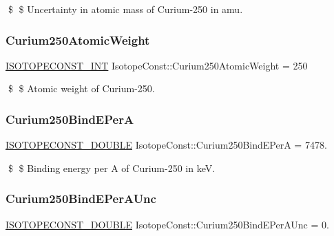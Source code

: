 \$ \$ Uncertainty in atomic mass of Curium-\/250 in amu. \mbox{\label{group___isotope_const-_curium-_cm250_gaf8953893f700808dee5cf132a2ff5e28}} 
\subsubsection{\texorpdfstring{Curium250\+Atomic\+Weight}{Curium250AtomicWeight}}
{\footnotesize\ttfamily \mbox{\hyperlink{group___isotope_const-_macros_ga5f18360b3e99483a35c32d789e62621c}{I\+S\+O\+T\+O\+P\+E\+C\+O\+N\+S\+T\+\_\+\+I\+NT}} Isotope\+Const\+::\+Curium250\+Atomic\+Weight = 250}

\$ \$ Atomic weight of Curium-\/250. \mbox{\label{group___isotope_const-_curium-_cm250_ga349eee1fcb5ab7ead66895273dc31655}} 
\subsubsection{\texorpdfstring{Curium250\+Bind\+E\+PerA}{Curium250BindEPerA}}
{\footnotesize\ttfamily \mbox{\hyperlink{group___isotope_const-_macros_ga8f45a7272ce02c0b4c65c44636ed719a}{I\+S\+O\+T\+O\+P\+E\+C\+O\+N\+S\+T\+\_\+\+D\+O\+U\+B\+LE}} Isotope\+Const\+::\+Curium250\+Bind\+E\+PerA = 7478.}

\$ \$ Binding energy per A of Curium-\/250 in keV. \mbox{\label{group___isotope_const-_curium-_cm250_gafda74e7e3f58a521e61c553b312f0cc1}} 
\subsubsection{\texorpdfstring{Curium250\+Bind\+E\+Per\+A\+Unc}{Curium250BindEPerAUnc}}
{\footnotesize\ttfamily \mbox{\hyperlink{group___isotope_const-_macros_ga8f45a7272ce02c0b4c65c44636ed719a}{I\+S\+O\+T\+O\+P\+E\+C\+O\+N\+S\+T\+\_\+\+D\+O\+U\+B\+LE}} Isotope\+Const\+::\+Curium250\+Bind\+E\+Per\+A\+Unc = 0.}

